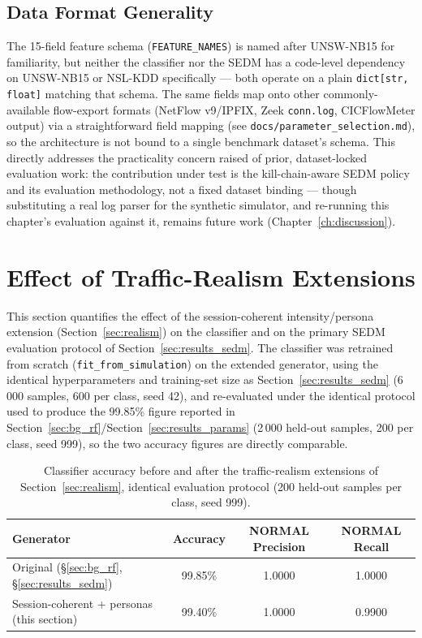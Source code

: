 \subsection{Data Format Generality}

The 15-field feature schema (\texttt{FEATURE\_NAMES}) is named after
UNSW-NB15 for familiarity, but neither the classifier nor the SEDM has a
code-level dependency on UNSW-NB15 or NSL-KDD specifically — both operate
on a plain \texttt{dict[str, float]} matching that schema. The same fields
map onto other commonly-available flow-export formats (NetFlow v9/IPFIX,
Zeek \texttt{conn.log}, CICFlowMeter output) via a straightforward field
mapping (see \texttt{docs/parameter\_selection.md}), so the architecture is
not bound to a single benchmark dataset's schema. This directly addresses
the practicality concern raised of prior, dataset-locked evaluation work:
the contribution under test is the kill-chain-aware SEDM policy and its
evaluation methodology, not a fixed dataset binding — though substituting a
real log parser for the synthetic simulator, and re-running this chapter's
evaluation against it, remains future work (Chapter~\ref{ch:discussion}).

\section{Effect of Traffic-Realism Extensions}
\label{sec:results_realism}

This section quantifies the effect of the session-coherent intensity/persona
extension (Section~\ref{sec:realism}) on the classifier and on the primary
SEDM evaluation protocol of Section~\ref{sec:results_sedm}. The classifier
was retrained from scratch (\texttt{fit\_from\_simulation}) on the extended
generator, using the identical hyperparameters and training-set size as
Section~\ref{sec:results_sedm} (6\,000 samples, 600 per class, seed 42), and
re-evaluated under the identical protocol used to produce the 99.85\%
figure reported in Section~\ref{sec:bg_rf}/Section~\ref{sec:results_params}
(2\,000 held-out samples, 200 per class, seed 999), so the two accuracy
figures are directly comparable.

\begin{table}[ht]
  \centering
  \small
  \caption{Classifier accuracy before and after the traffic-realism
           extensions of Section~\ref{sec:realism}, identical evaluation
           protocol (200 held-out samples per class, seed 999).}
  \label{tab:realism_accuracy}
  \begin{tabular}{lccc}
    \toprule
    Generator & Accuracy & NORMAL Precision & NORMAL Recall \\
    \midrule
    Original (\S\ref{sec:bg_rf}, \S\ref{sec:results_sedm}) & 99.85\% & 1.0000 & 1.0000 \\
    Session-coherent + personas (this section) & 99.40\% & 1.0000 & 0.9900 \\
    \bottomrule
  \end{tabular}
\end{table}

